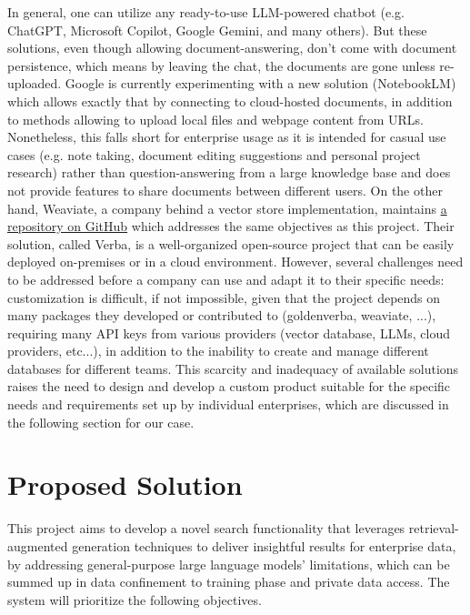 In general, one can utilize any ready-to-use LLM-powered chatbot (e.g. ChatGPT, Microsoft Copilot, Google Gemini, and many others). But these solutions, even though allowing document-answering, don't come with document persistence, which means by leaving the chat, the documents are gone unless re-uploaded.\newline
Google is currently experimenting with a new solution (NotebookLM) which allows exactly that by connecting to cloud-hosted documents, in addition to methods allowing to upload local files and webpage content from URLs. Nonetheless, this falls short for enterprise usage as it is intended for casual use cases (e.g. note taking, document editing suggestions and personal project research) rather than question-answering from a large knowledge base and does not provide features to share documents between different users. On the other hand, Weaviate, a company behind a vector store implementation, maintains \href{https://github.com/weaviate/Verba}{a repository on GitHub} which addresses the same objectives as this project. Their solution, called Verba, is a well-organized open-source project that can be easily deployed on-premises or in a cloud environment. However, several challenges need to be addressed before a company can use and adapt it to their specific needs: customization is difficult, if not impossible, given that the project depends on many packages they developed or contributed to (goldenverba, weaviate, ...), requiring many API keys from various providers (vector database, LLMs, cloud providers, etc...), in addition to the inability to create and manage different databases for different teams.\smallskip\newline
This scarcity and inadequacy of available solutions raises the need to design and develop a custom product suitable for the specific needs and requirements set up by individual enterprises, which are discussed in the following section for our case.

\section{Proposed Solution}
This project aims to develop a novel search functionality that leverages retrieval-augmented generation techniques to deliver insightful results for enterprise data, by addressing general-purpose large language models' limitations, which can be summed up in data confinement to training phase and private data access. The system will prioritize the following objectives.
